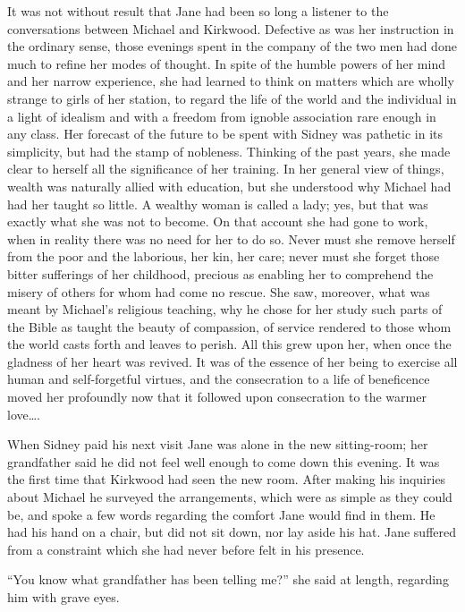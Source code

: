 It was not without result that Jane had been so long a listener to the
conversations between Michael and Kirkwood. Defective as was her
instruction in the ordinary sense, those evenings spent in the company
of the two men had done much to refine her modes of thought. In spite of
the humble powers of her mind and her narrow experience, she had learned
to think on matters which are wholly strange to girls of her station, to
regard the life of the world and the individual in a light of idealism
and with a freedom from ignoble association rare enough in any class.
Her forecast of the future to be spent with Sidney was pathetic in its
simplicity, but had the stamp of nobleness. Thinking of the past years,
she made clear to herself {}all the significance of her training. In her
general view of things, wealth was naturally allied with education, but
she understood why Michael had had her taught so little. A wealthy woman
is called a lady; yes, but that was exactly what she was not to become.
On that account she had gone to work, when in reality there was no need
for her to do so. Never must she remove herself from the poor and the
laborious, her kin, her care; never must she forget those bitter
sufferings of her childhood, precious as enabling her to comprehend the
misery of others for whom had come no rescue. She saw, moreover, what
was meant by Michael's religious teaching, why he chose for her study
such parts of the Bible as taught the beauty of compassion, of service
rendered to those whom the world casts forth and leaves to perish. All
this grew upon her, when once the gladness of her heart was revived. It
was of the essence of her being to exercise all human and self-forgetful
virtues, and the consecration to a life of beneficence moved her
profoundly now {}that it followed upon consecration to the warmer
love\ldots{}.

When Sidney paid his next visit Jane was alone in the new sitting-room;
her grandfather said he did not feel well enough to come down this
evening. It was the first time that Kirkwood had seen the new room.
After making his inquiries about Michael he surveyed the arrangements,
which were as simple as they could be, and spoke a few words regarding
the comfort Jane would find in them. He had his hand on a chair, but did
not sit down, nor lay aside his hat. Jane suffered from a constraint
which she had never before felt in his presence.

``You know what grandfather has been telling me?'' she said at length,
regarding him with grave eyes.

